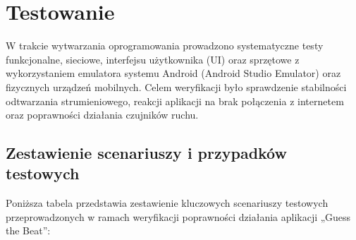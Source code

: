 \newpage
\section{Testowanie}	%

\hspace{0.60cm}W trakcie wytwarzania oprogramowania prowadzono systematyczne testy funkcjonalne, sieciowe, interfejsu użytkownika (UI) oraz sprzętowe z wykorzystaniem emulatora systemu Android (Android Studio Emulator) oraz fizycznych urządzeń mobilnych. Celem weryfikacji było sprawdzenie stabilności odtwarzania strumieniowego, reakcji aplikacji na brak połączenia z internetem oraz poprawności działania czujników ruchu.

\subsection{Zestawienie scenariuszy i przypadków testowych}

\hspace{0.60cm}Poniższa tabela przedstawia zestawienie kluczowych scenariuszy testowych przeprowadzonych w ramach weryfikacji poprawności działania aplikacji „Guess the Beat”:

